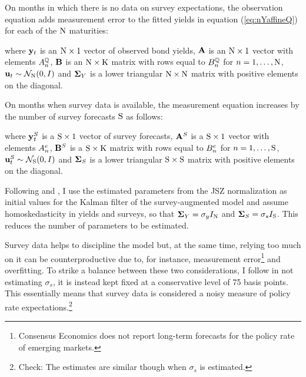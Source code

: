 {On months in which there is no data on survey expectations, the observation equation adds measurement error to the fitted yields in equation (\ref{eq:nYaffineQ}) for each of the \(\mathrm{N}\) maturities:
	
\noindent where \(\mathbf{y}_{t}\) is an \(\mathrm{N} \times 1\) vector of observed bond yields, \(\mathbf{A}\) is an \(\mathrm{N} \times 1\) vector with elements \(A_{n}^{\mathbb{Q}}\), \(\mathbf{B}\) is an \(\mathrm{N} \times \mathrm{K}\) matrix with rows equal to \(B_{n}^{\mathbb{Q}}\) for \(n = 1, \ldots, \mathrm{N}\), \(\mathbf{u}_{t} \sim \mathcal{N}_{\mathrm{N}} (0,I) \) and \(\mathbf{\mathbf{\Sigma}}_{Y}\) is a lower triangular \(\mathrm{N} \times \mathrm{N}\) matrix with positive elements on the diagonal.

On months when survey data is available, the measurement equation increases by the number of survey forecasts \(\mathrm{S}\) as follows:
	
\noindent where \(\mathbf{y}_{t}^{S}\) is a \(\mathrm{S} \times 1\) vector of survey forecasts, \(\mathbf{A}^{S}\) is a \(\mathrm{S} \times 1\) vector with elements \(A_{n}^{e}\), \(\mathbf{B}^{S}\) is a \(\mathrm{S} \times \mathrm{K}\) matrix with rows equal to \(B_{n}^{e}\) for \(n = 1, \ldots, \mathrm{S}\), \(\mathbf{u}_{t}^{S} \sim \mathcal{N}_{\mathrm{S}} (0,I) \) and \(\mathbf{\mathbf{\Sigma}}_{S}\) is a lower triangular \(\mathrm{S} \times \mathrm{S}\) matrix with positive elements on the diagonal.

Following \cite{Guimaraes:2014} and \cite{Lloyd:2018b}, I use the estimated parameters from the JSZ normalization as initial values for the Kalman filter of the survey-augmented model and assume homoskedasticity in yields and surveys, so that \(\mathbf{\mathbf{\Sigma}}_{Y} = \sigma_y I_{\mathrm{N}} \) and \(\mathbf{\mathbf{\Sigma}}_{S} = \sigma_s I_{\mathrm{S}}\).
This reduces the number of parameters to be estimated.

Survey data helps to discipline the model but, at the same time, relying too much on it can be counterproductive due to, for instance, measurement error\footnote{ Consensus Economics does not report long-term forecasts for the policy rate of emerging markets.} and overfitting. 
To strike a balance between these two considerations, I follow \cite{KimWright:2005} in not estimating \(\sigma_s\), it is instead kept fixed at a conservative level of 75 basis points. This essentially means that survey data is considered a noisy measure of policy rate expectations.\footnote{ Check: The estimates are similar though when \(\sigma_s\) is estimated.}


}

